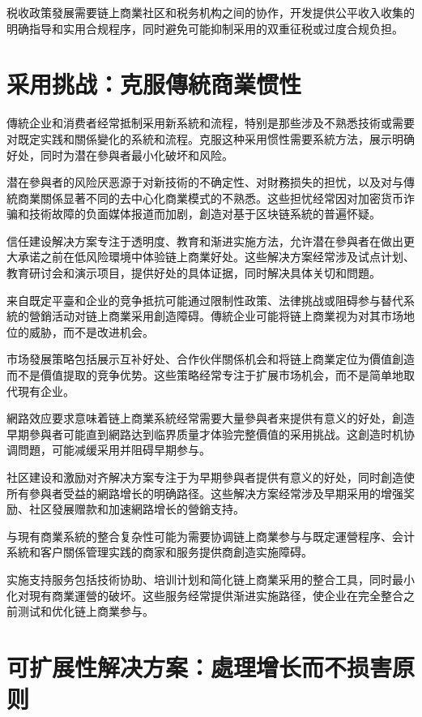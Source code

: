 \documentclass[
  Letterpaper,
]{scrbook}
\begin{document}
税收政策發展需要链上商業社区和税务机构之间的协作，开发提供公平收入收集的明确指导和实用合规程序，同时避免可能抑制采用的双重征税或过度合规负担。

\section{采用挑战：克服傳統商業惯性}\label{ux91c7ux7528ux6311ux6218ux514bux670dux50b3ux7d71ux5546ux696dux60efux6027}

傳統企业和消费者经常抵制采用新系統和流程，特别是那些涉及不熟悉技術或需要对既定实践和關係變化的系統和流程。克服这种采用惯性需要系統方法，展示明确好处，同时为潜在參與者最小化破坏和风险。

潜在參與者的风险厌恶源于对新技術的不确定性、对財務损失的担忧，以及对与傳統商業關係显著不同的去中心化商業模式的不熟悉。这些担忧经常因对加密货币诈骗和技術故障的负面媒体报道而加剧，創造对基于区块链系統的普遍怀疑。

信任建设解决方案专注于透明度、教育和渐进实施方法，允许潜在參與者在做出更大承诺之前在低风险環境中体验链上商業好处。这些解决方案经常涉及试点计划、教育研讨会和演示项目，提供好处的具体证据，同时解决具体关切和問題。

来自既定平臺和企业的竞争抵抗可能通过限制性政策、法律挑战或阻碍参与替代系統的營銷活动对链上商業采用創造障碍。傳統企业可能将链上商業视为对其市场地位的威胁，而不是改进机会。

市场發展策略包括展示互补好处、合作伙伴關係机会和将链上商業定位为價值創造而不是價值提取的竞争优势。这些策略经常专注于扩展市场机会，而不是简单地取代現有企业。

網路效应要求意味着链上商業系統经常需要大量參與者来提供有意义的好处，創造早期參與者可能直到網路达到临界质量才体验完整價值的采用挑战。这創造时机协调問題，可能减缓采用并阻碍早期参与。

社区建设和激励对齐解决方案专注于为早期參與者提供有意义的好处，同时創造使所有參與者受益的網路增长的明确路径。这些解决方案经常涉及早期采用的增强奖励、社区發展赠款和加速網路增长的營銷支持。

与現有商業系統的整合复杂性可能为需要协调链上商業参与与既定運營程序、会计系統和客户關係管理实践的商家和服务提供商創造实施障碍。

实施支持服务包括技術协助、培训计划和简化链上商業采用的整合工具，同时最小化对現有商業運營的破坏。这些服务经常提供渐进实施路径，使企业在完全整合之前测试和优化链上商業参与。

\section{可扩展性解决方案：處理增长而不损害原则}\label{ux53efux6269ux5c55ux6027ux89e3ux51b3ux65b9ux6848ux8655ux7406ux589eux957fux800cux4e0dux635fux5bb3ux539fux5219}
\end{document}
